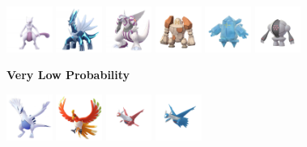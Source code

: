 \documentclass[12pt]{beamer}
\begin{document}
\begin{frame}
\begin{block}{}
\begin{footnotesize}
\begin{center}
 \includegraphics[width=1.5cm]{../../images/pokemon/mewtwo.png}\quad\quad
 \includegraphics[width=1.5cm]{../../images/pokemon/dialga.png}\quad\quad
 \includegraphics[width=1.5cm]{../../images/pokemon/palkia.png}\quad\quad
 \includegraphics[width=1.5cm]{../../images/pokemon/regirock.png}\quad\quad
 \includegraphics[width=1.5cm]{../../images/pokemon/regice.png}\quad\quad
 \includegraphics[width=1.5cm]{../../images/pokemon/registeel.png}

\bigskip\bigskip

\textbf{Very Low Probability}

 \includegraphics[width=1.5cm]{../../images/pokemon/lugia.png}\quad\quad
 \includegraphics[width=1.5cm]{../../images/pokemon/ho-oh.png}\quad\quad
 \includegraphics[width=1.5cm]{../../images/pokemon/latias.png}\quad\quad
 \includegraphics[width=1.5cm]{../../images/pokemon/latios.png}
 

\end{center}
\end{footnotesize}
\end{block}
\end{frame}
\end{document}
